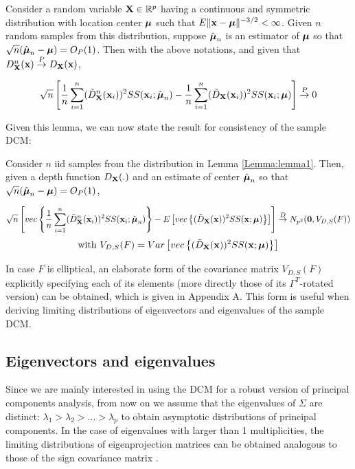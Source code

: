 \documentclass[fleqn,12pt]{article}
\begin{document}
\begin{Lemma} \label{Lemma:lemma1}
Consider a random variable ${\mathbf{X}} \in \mathbb{R}^p$ having a continuous and symmetric distribution with location center ${\boldsymbol{\mu}}$ such that $E\|{\bf{x}} - {\boldsymbol{\mu}} \|^{-3/2} < \infty$. Given $n$ random samples from this distribution, suppose $\hat{{\boldsymbol{\mu}}}_n$ is an estimator of ${\boldsymbol{\mu}}$ so that $\sqrt n (\hat{{\boldsymbol{\mu}}}_n - {\boldsymbol{\mu}}) = O_P(1) $. Then with the above notations, and given that $D^n_{\mathbf{X}} ({\bf{x}}) \stackrel{P}{\rightarrow} D_{\mathbf{X}} ({\bf{x}})$,

$$ \sqrt n \left[
\frac{1}{n} \sum_{i=1}^n (\tilde D^n_{\mathbf{X}} ({\bf{x}}_i))^2 SS({\bf{x}}_i; \hat{{\boldsymbol{\mu}}}_n) -
\frac{1}{n} \sum_{i=1}^n (\tilde D_{\mathbf{X}} ({\bf{x}}_i))^2 SS({\bf{x}}_i; {\boldsymbol{\mu}}) \right]
\stackrel{P}{\rightarrow} 0 $$
\end{Lemma}

Given this lemma, we can now state the result for consistency of the sample DCM:

\begin{Theorem} \label{Theorem:rootn}
Consider $n$ iid samples from the distribution in Lemma \ref{Lemma:lemma1}. Then, given a depth function $D_{\mathbf{X}}(.)$ and an estimate of center $\hat{{\boldsymbol{\mu}}}_n$ so that $\sqrt n(\hat {{\boldsymbol{\mu}}}_n - {\boldsymbol{\mu}}) = O_P(1)$,

$$ \sqrt n \left[ vec\left\{ \frac{1}{n} \sum_{i=1}^n (\tilde D^n_{\mathbf{X}} ({\bf{x}}_i))^2 SS({\bf{x}}_i; \hat{{\boldsymbol{\mu}}}_n) \right\} - E \left[ vec\left\{ (\tilde D_{\mathbf{X}} ({\bf{x}}))^2 SS({\bf{x}}; {\boldsymbol{\mu}}) \right\} \right] \right]
\stackrel{D}{\rightarrow}
N_{p^2} ({\bf 0}, V_{D,S}(F)) $$
$$ \text{with } V_{D,S}(F) = Var \left[vec \left\{ (\tilde D_{\mathbf{X}} ({\bf{x}}))^2 SS({\bf{x}}; {\boldsymbol{\mu}}) \right\} \right] $$
\end{Theorem}

In case $F$ is elliptical, an elaborate form of the covariance matrix $V_{D,S}(F)$ explicitly specifying each of its elements (more directly those of its $\Gamma^T$-rotated version) can be obtained, which is given in Appendix A. This form is useful when deriving limiting distributions of eigenvectors and eigenvalues of the sample DCM.

\subsection{Eigenvectors and eigenvalues} Since we are mainly interested in using the DCM for a robust version of principal components analysis, from now on we assume that the eigenvalues of $\Sigma$ are distinct: $\lambda_1 > \lambda_2 > ... > \lambda_p$ to obtain asymptotic distributions of principal components. In the case of eigenvalues with larger than 1 multiplicities, the limiting distributions of eigenprojection matrices can be obtained analogous to those of the sign covariance matrix \citep{magyar14}.
\end{document}
